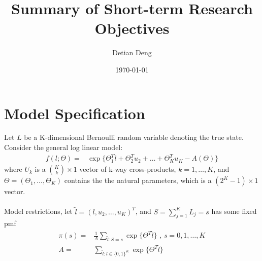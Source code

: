 \documentclass[11 pt, a4paper]{article}  %
\begin{document}
\title{Summary of Short-term Research Objectives}   %
\author{Detian Deng}         %
\date{\today}    %
\maketitle


\section{Model Specification}             %
Let $L$ be a K-dimensional Bernoulli random variable denoting the true state.
Consider the general log linear model:
\begin{align*}
f(l; \Theta) = & \exp \{\Theta_1^T l + \Theta_2^{T} u_2 + \ldots + \Theta_K^T u_K - A(\Theta)\}
\end{align*}
where $U_k$ is a ${K \choose k} \times 1$ vector of k-way cross-products, $k = 1,\ldots,K$,  and $\Theta = (\Theta_1,\ldots, \Theta_K)$ contains the the natural parameters, which is a $(2^K-1) \times 1$ vector.\\
\ \\
Model restrictions, let $\tilde{l} = (l,u_2,\dots,u_K)^T$, and $S = \sum_{j=1}^K L_j = s$ has some fixed pmf 
\begin{align}
\pi(s) = & \frac{1}{A} \sum_{\tilde{l}:S=s}\exp \{ \Theta^T \tilde{l}\}  \text{ , } s = 0,1,\ldots, K \\
A = & \sum_{\tilde{l}:l\in \{0,1\}^K}\exp \{ \Theta^T \tilde{l}\}
\end{align}

\newpage
\end{document}
